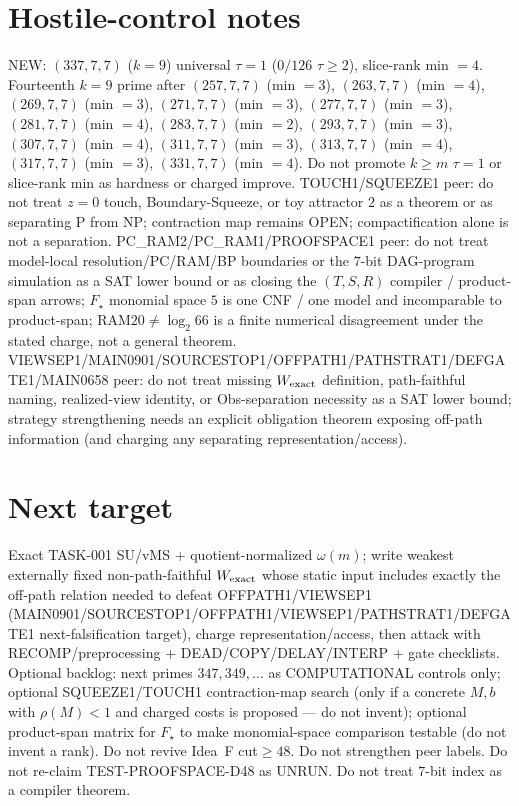 \documentclass[11pt]{article}
\begin{document}
\section*{Hostile-control notes}
NEW: $(337,7,7)$ ($k{=}9$) universal $\tau{=}1$ ($0/126$ $\tau{\ge}2$), slice-rank min $=4$.
Fourteenth $k{=}9$ prime after $(257,7,7)$ (min $=3$), $(263,7,7)$ (min $=4$), $(269,7,7)$ (min $=3$), $(271,7,7)$ (min $=3$), $(277,7,7)$ (min $=3$), $(281,7,7)$ (min $=4$), $(283,7,7)$ (min $=2$), $(293,7,7)$ (min $=3$), $(307,7,7)$ (min $=4$), $(311,7,7)$ (min $=3$), $(313,7,7)$ (min $=4$), $(317,7,7)$ (min $=3$), $(331,7,7)$ (min $=4$).
Do not promote $k{\ge}m$ $\tau{=}1$ or slice-rank min as hardness or charged improve.
TOUCH1/SQUEEZE1 peer: do not treat $z{=}0$ touch, Boundary-Squeeze, or toy attractor $2$ as a theorem or as separating P from NP;
contraction map remains OPEN; compactification alone is not a separation.
PC\_RAM2/PC\_RAM1/PROOFSPACE1 peer: do not treat model-local resolution/PC/RAM/BP boundaries or the $7$-bit DAG-program simulation as a SAT lower bound
or as closing the $(T,S,R)$ compiler / product-span arrows; $F_\star$ monomial space $5$ is one CNF / one model and incomparable to product-span;
RAM$20\neq\log_2 66$ is a finite numerical disagreement under the stated charge, not a general theorem.
VIEWSEP1/MAIN0901/SOURCESTOP1/OFFPATH1/PATHSTRAT1/DEFGATE1/MAIN0658 peer: do not treat missing $W_{\rm exact}$ definition,
path-faithful naming, realized-view identity, or Obs-separation necessity as a SAT lower bound;
strategy strengthening needs an explicit obligation theorem exposing off-path information
(and charging any separating representation/access).

\section*{Next target}
Exact TASK-001 SU/vMS + quotient-normalized $\omega(m)$; write weakest externally fixed non-path-faithful
$W_{\rm exact}$ whose static input includes exactly the off-path relation needed to defeat OFFPATH1/VIEWSEP1
(MAIN0901/SOURCESTOP1/OFFPATH1/VIEWSEP1/PATHSTRAT1/DEFGATE1 next-falsification target), charge representation/access,
then attack with RECOMP/preprocessing + DEAD/COPY/DELAY/INTERP + gate checklists.
Optional backlog: next primes $347,349,\ldots$ as COMPUTATIONAL controls only;
optional SQUEEZE1/TOUCH1 contraction-map search (only if a concrete $M,b$ with $\rho(M)\lt 1$ and charged costs is proposed --- do not invent);
optional product-span matrix for $F_\star$ to make monomial-space comparison testable (do not invent a rank).
Do not revive Idea~F cut$\ge48$. Do not strengthen peer labels.
Do not re-claim TEST-PROOFSPACE-D48 as UNRUN.
Do not treat $7$-bit index as a compiler theorem.
\end{document}
